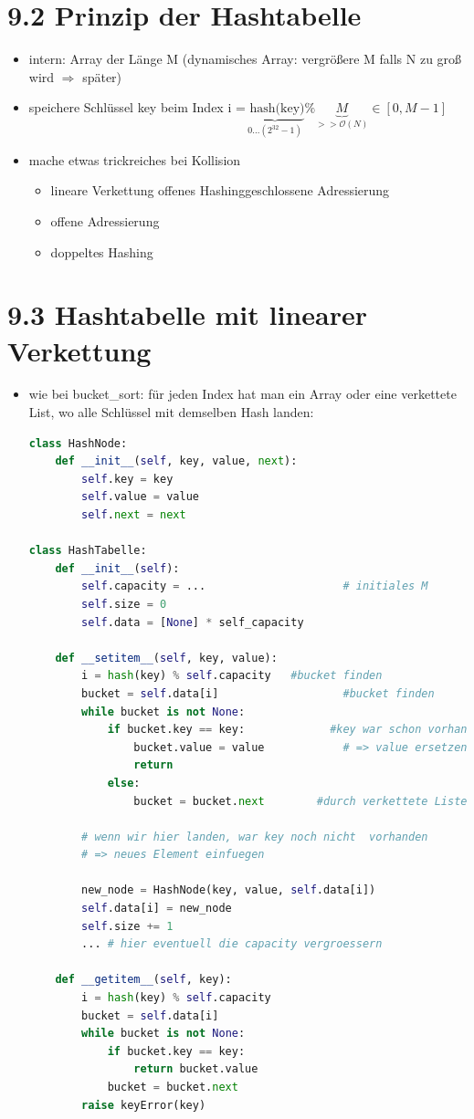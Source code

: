 \documentclass[11pt, fleqn]{scrreprt}
\begin{document}
\section*{9.2 Prinzip der Hashtabelle}
\begin{itemize}
	\item intern: Array der Länge M (dynamisches Array: vergrößere M falls N zu groß wird $\Rightarrow$ später)
	\item speichere Schlüssel key beim Index i =$\underbrace{\text{ hash(key)}}_{0...(2^{32}-1)} \% \underbrace{M}_{>> \mathcal{O}(N)} \in [0, M-1]$ 
	\item mache etwas trickreiches bei Kollision
	\begin{itemize}
		\item lineare Verkettung \hspace*{5mm} \glqq offenes Hashing\grqq \glqq geschlossene Adressierung\grqq 
		\item offene Adressierung
		\item doppeltes Hashing
	\end{itemize}
\end{itemize}

\section*{9.3 Hashtabelle mit linearer Verkettung}
\begin{itemize}
	\item wie bei bucket\_sort: für jeden Index hat man ein Array oder eine verkettete List, wo alle Schlüssel mit demselben Hash landen:
	\begin{lstlisting}[language=Python]
class HashNode:
	def __init__(self, key, value, next):
		self.key = key
		self.value = value
		self.next = next

class HashTabelle:
	def __init__(self):
		self.capacity = ... 					# initiales M
		self.size = 0
		self.data = [None] * self_capacity

	def __setitem__(self, key, value):
		i = hash(key) % self.capacity	#bucket finden
		bucket = self.data[i]					#bucket finden
		while bucket is not None:
			if bucket.key == key:			  #key war schon vorhanden
				bucket.value = value 			# => value ersetzen
				return
			else:
				bucket = bucket.next    	#durch verkettete Liste iterieren

		# wenn wir hier landen, war key noch nicht 	vorhanden
		# => neues Element einfuegen

		new_node = HashNode(key, value, self.data[i])
		self.data[i] = new_node
		self.size += 1
		... # hier eventuell die capacity vergroessern
		
	def __getitem__(self, key):
		i = hash(key) % self.capacity
		bucket = self.data[i]
		while bucket is not None:
			if bucket.key == key:
				return bucket.value
			bucket = bucket.next
		raise keyError(key)
	\end{lstlisting}
\end{itemize}
\end{document}
